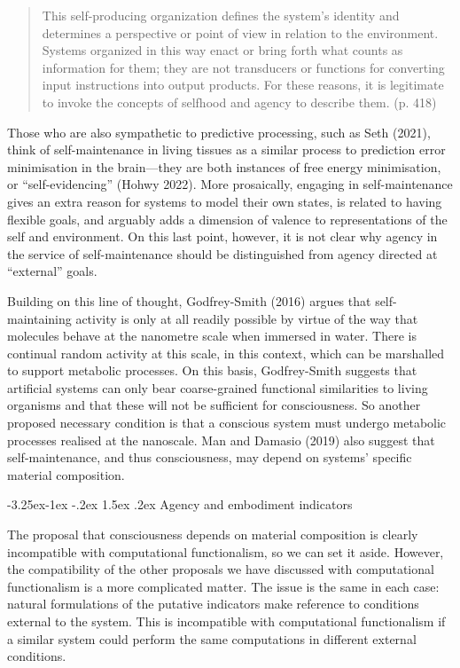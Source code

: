 \documentclass[12pt]{article}
\makeatletter
\newenvironment{myquote}
  {\begin{quote}\leftskip=1cm\rightskip=1cm}
  {\end{quote}}
\newcounter{subsubsubsection}[subsubsection]
\def\subsubsubsection{\@startsection{subsubsubsection}{4}{\z@}%
                                     {-3.25ex\@plus -1ex \@minus -.2ex}%
                                     {1.5ex \@plus .2ex}%
                                     {\normalfont\normalsize\itshape}}
\makeatother
\begin{document}
\begin{myquote}
This self-producing organization defines the system’s identity and determines a perspective or point of view in relation to the environment. Systems organized in this way enact or bring forth what counts as information for them; they are not transducers or functions for converting input instructions into output products. For these reasons, it is legitimate to invoke the concepts of selfhood and agency to describe them. (p. 418)
\end{myquote}

Those who are also sympathetic to predictive processing, such as Seth (2021), think of self-maintenance in living tissues as a similar process to prediction error minimisation in the brain—they are both instances of free energy minimisation, or ``self-evidencing'' (Hohwy 2022). More prosaically, engaging in self-maintenance gives an extra reason for systems to model their own states, is related to having flexible goals, and arguably adds a dimension of valence to representations of the self and environment. On this last point, however, it is not clear why agency in the service of self-maintenance should be distinguished from agency directed at ``external'' goals.

Building on this line of thought, Godfrey-Smith (2016) argues that self-maintaining activity is only at all readily possible by virtue of the way that molecules behave at the nanometre scale when immersed in water. There is continual random activity at this scale, in this context, which can be marshalled to support metabolic processes. On this basis, Godfrey-Smith suggests that artificial systems can only bear coarse-grained functional similarities to living organisms and that these will not be sufficient for consciousness. So another proposed necessary condition is that a conscious system must undergo metabolic processes realised at the nanoscale. Man and Damasio (2019) also suggest that self-maintenance, and thus consciousness, may depend on systems’ specific material composition.

{}
\subsubsubsection{Agency and embodiment indicators}

The proposal that consciousness depends on material composition is clearly incompatible with computational functionalism, so we can set it aside. However, the compatibility of the other proposals we have discussed with computational functionalism is a more complicated matter. The issue is the same in each case: natural formulations of the putative indicators make reference to conditions external to the system. This is incompatible with computational functionalism if a similar system could perform the same computations in different external conditions.
\end{document}
